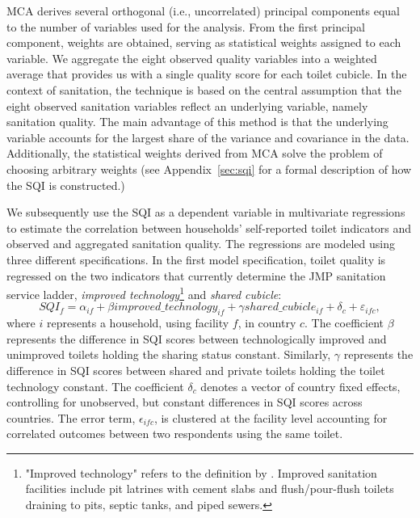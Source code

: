 \documentclass[natbib]{svjour3}                     %
\begin{document}
MCA derives several orthogonal (i.e., uncorrelated) principal components equal to the number of variables used for the analysis. From the first principal component, weights are obtained, serving as statistical weights assigned to each variable. We aggregate the eight observed quality variables into a weighted average that provides us with a single quality score for each toilet cubicle. In the context of sanitation, the technique is based on the central assumption that the eight observed sanitation variables reflect an underlying variable, namely sanitation quality. The main advantage of this method is that the underlying variable accounts for the largest share of the variance and covariance in the data. Additionally, the statistical weights derived from MCA solve the problem of choosing arbitrary weights (see Appendix~\ref{sec:sqi} for a formal description of how the SQI is constructed.)

We subsequently use the SQI as a dependent variable in multivariate regressions to estimate the correlation between households' self-reported toilet indicators and observed and aggregated sanitation quality. The regressions are modeled using three different specifications. In the first model specification, toilet quality is regressed on the two indicators that currently determine the JMP sanitation service ladder, \textit{improved technology}\footnote{"Improved technology" refers to the definition by \cite{JMP2018}. Improved sanitation facilities include pit latrines with cement slabs and flush/pour-flush toilets draining to pits, septic tanks, and piped sewers.} and \textit{shared cubicle}:
\begin{equation}
\label{eq:reg1}
    SQI_{f} = \alpha_{if}+ \beta improved\_technology_{if} + \gamma shared\_cubicle_{if} + \delta_c +\varepsilon_{ifc},
\end{equation}
where $i$ represents a household, using facility $f$, in country $c$. The coefficient $\beta$ represents the difference in SQI scores between technologically improved and unimproved toilets holding the sharing status constant. Similarly, $\gamma$ represents the difference in SQI scores between shared and private toilets holding the toilet technology constant. The coefficient $\delta_c$ denotes a vector of country fixed effects, controlling for unobserved, but constant differences in SQI scores across countries. The error term, $\epsilon_{ifc}$, is clustered at the facility level accounting for correlated outcomes between two respondents using the same toilet. 
\end{document}
